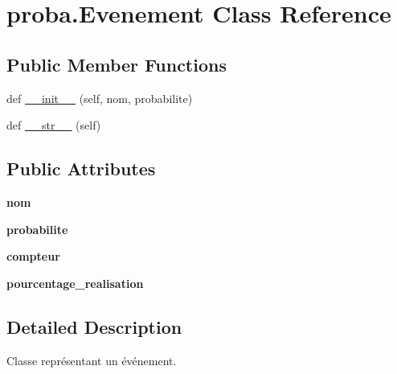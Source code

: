 \hypertarget{classproba_1_1Evenement}{}\section{proba.\+Evenement Class Reference}
\label{classproba_1_1Evenement}
\subsection*{Public Member Functions}
\begin{DoxyCompactItemize}
\item 
def \hyperlink{classproba_1_1Evenement_adf26b397f3c7dd7da2ef776afa2f4ad0}{\+\_\+\+\_\+init\+\_\+\+\_\+} (self, nom, probabilite)
\item 
def \hyperlink{classproba_1_1Evenement_af050127b429bf802657b168c83ce1178}{\+\_\+\+\_\+str\+\_\+\+\_\+} (self)
\end{DoxyCompactItemize}
\subsection*{Public Attributes}
\begin{DoxyCompactItemize}
\item 
{\bfseries nom}\hypertarget{classproba_1_1Evenement_a648c2517265de40ac3b2cbc103685134}{}\label{classproba_1_1Evenement_a648c2517265de40ac3b2cbc103685134}

\item 
{\bfseries probabilite}\hypertarget{classproba_1_1Evenement_aeac5d19d59ada3a61b70cf4ba7430263}{}\label{classproba_1_1Evenement_aeac5d19d59ada3a61b70cf4ba7430263}

\item 
{\bfseries compteur}\hypertarget{classproba_1_1Evenement_aa6d786e9adbe88999bd16142af924c6a}{}\label{classproba_1_1Evenement_aa6d786e9adbe88999bd16142af924c6a}

\item 
{\bfseries pourcentage\+\_\+realisation}\hypertarget{classproba_1_1Evenement_a3c8adfbb106d9e80eb892b481382bc09}{}\label{classproba_1_1Evenement_a3c8adfbb106d9e80eb892b481382bc09}

\end{DoxyCompactItemize}


\subsection{Detailed Description}
\begin{DoxyVerb}    Classe représentant un événement.
\end{DoxyVerb}
 

